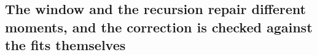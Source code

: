 \subsection*{The window and the recursion repair different moments, and the correction is checked against the fits themselves}
\begin{figure}[htbp]
\begin{fullwidth}
\centering

\end{fullwidth}
\end{figure}
